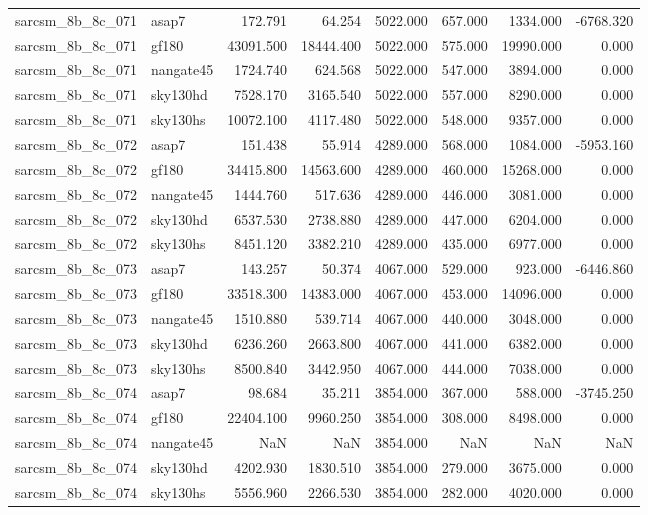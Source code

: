 \begin{tabular}{llrrrrrr}
sarcsm\_8b\_8c\_071 & asap7 & 172.791 & 64.254 & 5022.000 & 657.000 & 1334.000 & -6768.320 \\
sarcsm\_8b\_8c\_071 & gf180 & 43091.500 & 18444.400 & 5022.000 & 575.000 & 19990.000 & 0.000 \\
sarcsm\_8b\_8c\_071 & nangate45 & 1724.740 & 624.568 & 5022.000 & 547.000 & 3894.000 & 0.000 \\
sarcsm\_8b\_8c\_071 & sky130hd & 7528.170 & 3165.540 & 5022.000 & 557.000 & 8290.000 & 0.000 \\
sarcsm\_8b\_8c\_071 & sky130hs & 10072.100 & 4117.480 & 5022.000 & 548.000 & 9357.000 & 0.000 \\
sarcsm\_8b\_8c\_072 & asap7 & 151.438 & 55.914 & 4289.000 & 568.000 & 1084.000 & -5953.160 \\
sarcsm\_8b\_8c\_072 & gf180 & 34415.800 & 14563.600 & 4289.000 & 460.000 & 15268.000 & 0.000 \\
sarcsm\_8b\_8c\_072 & nangate45 & 1444.760 & 517.636 & 4289.000 & 446.000 & 3081.000 & 0.000 \\
sarcsm\_8b\_8c\_072 & sky130hd & 6537.530 & 2738.880 & 4289.000 & 447.000 & 6204.000 & 0.000 \\
sarcsm\_8b\_8c\_072 & sky130hs & 8451.120 & 3382.210 & 4289.000 & 435.000 & 6977.000 & 0.000 \\
sarcsm\_8b\_8c\_073 & asap7 & 143.257 & 50.374 & 4067.000 & 529.000 & 923.000 & -6446.860 \\
sarcsm\_8b\_8c\_073 & gf180 & 33518.300 & 14383.000 & 4067.000 & 453.000 & 14096.000 & 0.000 \\
sarcsm\_8b\_8c\_073 & nangate45 & 1510.880 & 539.714 & 4067.000 & 440.000 & 3048.000 & 0.000 \\
sarcsm\_8b\_8c\_073 & sky130hd & 6236.260 & 2663.800 & 4067.000 & 441.000 & 6382.000 & 0.000 \\
sarcsm\_8b\_8c\_073 & sky130hs & 8500.840 & 3442.950 & 4067.000 & 444.000 & 7038.000 & 0.000 \\
sarcsm\_8b\_8c\_074 & asap7 & 98.684 & 35.211 & 3854.000 & 367.000 & 588.000 & -3745.250 \\
sarcsm\_8b\_8c\_074 & gf180 & 22404.100 & 9960.250 & 3854.000 & 308.000 & 8498.000 & 0.000 \\
sarcsm\_8b\_8c\_074 & nangate45 & NaN & NaN & 3854.000 & NaN & NaN & NaN \\
sarcsm\_8b\_8c\_074 & sky130hd & 4202.930 & 1830.510 & 3854.000 & 279.000 & 3675.000 & 0.000 \\
sarcsm\_8b\_8c\_074 & sky130hs & 5556.960 & 2266.530 & 3854.000 & 282.000 & 4020.000 & 0.000 \\

\end{tabular}

